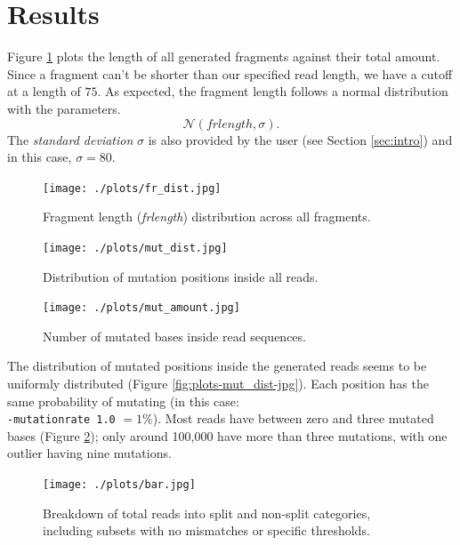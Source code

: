 \documentclass[12pt]{article}
\begin{document}
\newpage
\section{Results}\label{sec:results}
Figure \ref{fig:plots-fr_dist-jpg} plots the length of all generated fragments against their total amount. 
Since a fragment can't be shorter than our specified read length, we have a cutoff at a length of $75$. 
As expected, the fragment length follows a normal distribution with the parameters. 
\[
    \mathcal{N}(frlength, \sigma)
.\]
The \textit{standard deviation} $\sigma$ is also provided by the user (see Section \ref{sec:intro}) and in this case,
$\sigma = 80$.

\begin{figure}[htpb]
    \centering
    \texttt{[image: ./plots/fr\_dist.jpg]}
    \caption{Fragment length (\textit{frlength}) distribution across all fragments.}
    \label{fig:plots-fr_dist-jpg}
\end{figure}    



\begin{figure}[ht]
    \centering
    \begin{minipage}[t]{0.45\textwidth} 
    \centering
    \texttt{[image: ./plots/mut\_dist.jpg]}
    \caption{Distribution of mutation positions inside all reads.}
    \label{fig:plots-mut_dist-jpg}
    \end{minipage}
    \hfill
    \begin{minipage}[t]{0.45\textwidth}
    \centering
    \texttt{[image: ./plots/mut\_amount.jpg]}
    \caption{Number of mutated bases inside read sequences.}
    \label{fig:plots-mut_amount-jpg}
    \end{minipage}
\end{figure}

The distribution of mutated positions inside the generated reads seems to be uniformly distributed (Figure \ref{fig:plots-mut_dist-jpg}). 
Each position has the same probability of mutating (in this case: \\ \texttt{-mutationrate 1.0} $ = 1\%$).
Most reads have between zero and three mutated bases (Figure \ref{fig:plots-mut_amount-jpg}); only around 100,000 have more 
than three mutations, with one outlier having nine mutations.

\begin{figure}[htpb]
    \centering
    \texttt{[image: ./plots/bar.jpg]}
    \caption{Breakdown of total reads into split and non-split categories, including subsets with no mismatches or specific thresholds.}
    \label{fig:plots-mut_bar-jpg}
\end{figure}
\end{document}
